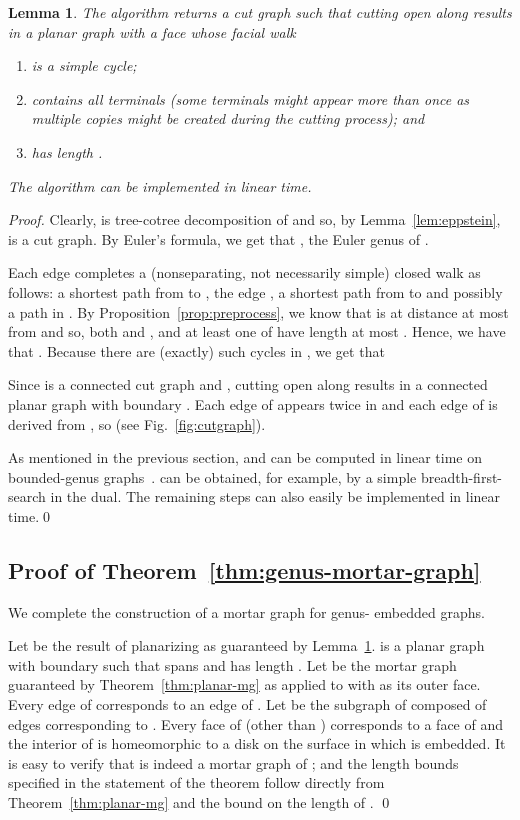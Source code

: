 \documentclass{article}
\newtheorem{lemma}[theorem]{Lemma}
\begin{document}
\begin{lemma} \label{lem:cut-graph} The algorithm 
  returns a cut graph  such that cutting
   open along  results in a planar graph  with a face
   whose facial walk 
\begin{enumerate} \item[(i)] is a simple cycle; 
\item[(ii)] contains all terminals (some terminals might appear more than
  once as multiple copies might be created during the cutting process); and
\item[(iii)] has length .
\end{enumerate}
The algorithm can be implemented in linear time.
\end{lemma}
\begin{proof}
  Clearly,  is tree-cotree decomposition of  and
  so, by Lemma~\ref{lem:eppstein},  is a cut graph. By
  Euler's formula, we get that , the Euler genus of . 

  Each
  edge  completes a (nonseparating,
  not necessarily simple) closed walk as follows: a shortest path  from
   to , the edge , a shortest path  from  to 
  and possibly a path  in . By
  Proposition~\ref{prop:preprocess}, we know that  is at distance
  at most  from  and so, both  and , and at least one of
   have length at most . Hence, we have that . Because there are (exactly)  such cycles in , we get
  that
  
  Since  is a connected cut graph and , cutting  open along  results in a connected
  planar graph with boundary .  Each edge of  appears
  twice in  and each edge of  is derived from ,
  so  (see
  Fig.~\ref{fig:cutgraph}).



  As mentioned in the previous section,  and  can be computed in
  linear time on bounded-genus
  graphs~\cite{HenzingerKRS97,TazariMuellerh09-DAM}.  can be obtained,
  for example, by a simple breadth-first-search in the dual. The remaining
  steps can also easily be implemented in linear time.\qed
\end{proof}

\subsection{Proof of Theorem~\ref{thm:genus-mortar-graph}} 

We complete the construction of a mortar graph for genus- embedded
graphs.

Let  be the result of planarizing  as guaranteed by
Lemma~\ref{lem:cut-graph}.   is a planar graph with
boundary  such that  spans  and has length .  Let  be the mortar graph guaranteed by
Theorem~\ref{thm:planar-mg} as applied to  with  as
its outer face.  Every edge of  corresponds to an edge of .
Let  be the subgraph of  composed of edges corresponding to
.  Every face  of  (other than ) corresponds to a
face  of  and the interior of  is homeomorphic to a disk
on the surface in which  is embedded.  It is easy to verify that
 is indeed a mortar graph of ; and the length bounds
specified in the statement of the theorem follow directly from
Theorem~\ref{thm:planar-mg} and the bound on the length of
. \qed
\end{document}
